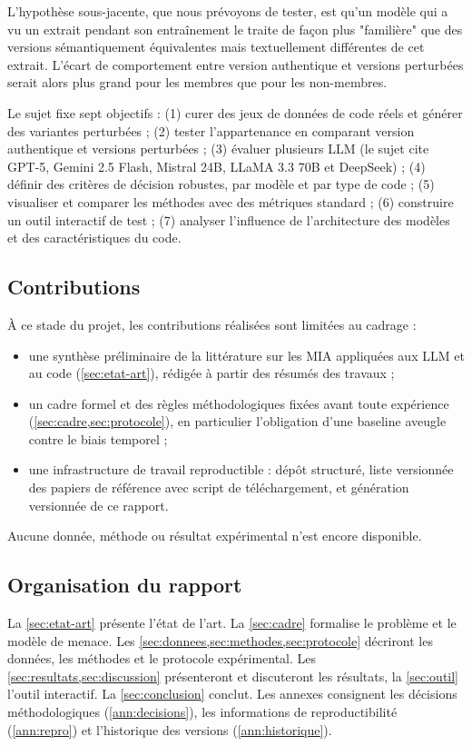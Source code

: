 		L'hypothèse sous-jacente, que nous prévoyons de tester, est qu'un modèle qui a vu un extrait pendant son entraînement le traite de façon plus "familière" que des versions sémantiquement équivalentes mais textuellement différentes de cet extrait. L'écart de comportement entre version authentique et versions perturbées serait alors plus grand pour les membres que pour les non-membres.

		Le sujet fixe sept objectifs : (1) curer des jeux de données de code réels et générer des variantes perturbées ; (2) tester l'appartenance en comparant version authentique et versions perturbées ; (3) évaluer plusieurs LLM (le sujet cite GPT-5, Gemini 2.5 Flash, Mistral 24B, LLaMA 3.3 70B et DeepSeek) ; (4) définir des critères de décision robustes, par modèle et par type de code ; (5) visualiser et comparer les méthodes avec des métriques standard ; (6) construire un outil interactif de test ; (7) analyser l'influence de l'architecture des modèles et des caractéristiques du code.

	\subsection{Contributions}\label{sec:intro-contributions}
		À ce stade du projet, les contributions réalisées sont limitées au cadrage :
		\begin{itemize}
			\item une synthèse préliminaire de la littérature sur les MIA appliquées aux LLM et au code (\cref{sec:etat-art}), rédigée à partir des résumés des travaux ;
			\item un cadre formel et des règles méthodologiques fixées avant toute expérience (\cref{sec:cadre,sec:protocole}), en particulier l'obligation d'une baseline aveugle contre le biais temporel ;
			\item une infrastructure de travail reproductible : dépôt structuré, liste versionnée des papiers de référence avec script de téléchargement, et génération versionnée de ce rapport.
		\end{itemize}
		Aucune donnée, méthode ou résultat expérimental n'est encore disponible.

	\subsection{Organisation du rapport}\label{sec:intro-plan}
		La \cref{sec:etat-art} présente l'état de l'art. La \cref{sec:cadre} formalise le problème et le modèle de menace. Les \cref{sec:donnees,sec:methodes,sec:protocole} décriront les données, les méthodes et le protocole expérimental. Les \cref{sec:resultats,sec:discussion} présenteront et discuteront les résultats, la \cref{sec:outil} l'outil interactif. La \cref{sec:conclusion} conclut. Les annexes consignent les décisions méthodologiques (\cref{ann:decisions}), les informations de reproductibilité (\cref{ann:repro}) et l'historique des versions (\cref{ann:historique}).
